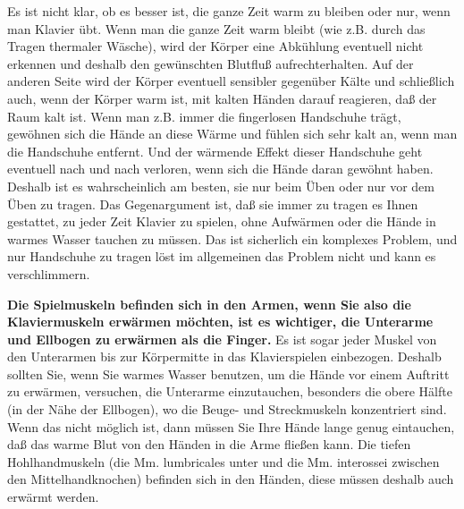 Es ist nicht klar, ob es besser ist, die ganze Zeit warm zu bleiben oder nur, wenn man Klavier übt.
Wenn man die ganze Zeit warm bleibt (wie z.B. durch das Tragen thermaler Wäsche), wird der Körper eine Abkühlung eventuell nicht erkennen und deshalb den gewünschten Blutfluß aufrechterhalten.
Auf der anderen Seite wird der Körper eventuell sensibler gegenüber Kälte und schließlich auch, wenn der Körper warm ist, mit kalten Händen darauf reagieren, daß der Raum kalt ist.
Wenn man z.B. immer die fingerlosen Handschuhe trägt, gewöhnen sich die Hände an diese Wärme und fühlen sich sehr kalt an, wenn man die Handschuhe entfernt.
Und der wärmende Effekt dieser Handschuhe geht eventuell nach und nach verloren, wenn sich die Hände daran gewöhnt haben.
Deshalb ist es wahrscheinlich am besten, sie nur beim Üben oder nur vor dem Üben zu tragen.
Das Gegenargument ist, daß sie immer zu tragen es Ihnen gestattet, zu jeder Zeit Klavier zu spielen, ohne Aufwärmen oder die Hände in warmes Wasser tauchen zu müssen.
Das ist sicherlich ein komplexes Problem, und nur Handschuhe zu tragen löst im allgemeinen das Problem nicht und kann es verschlimmern.

\textbf{Die Spielmuskeln befinden sich in den Armen, wenn Sie also die Klaviermuskeln erwärmen möchten, ist es wichtiger, die Unterarme und Ellbogen zu erwärmen als die Finger.}
Es ist sogar jeder Muskel von den Unterarmen bis zur Körpermitte in das Klavierspielen einbezogen.
Deshalb sollten Sie, wenn Sie warmes Wasser benutzen, um die Hände vor einem Auftritt zu erwärmen, versuchen, die Unterarme einzutauchen, besonders die obere Hälfte (in der Nähe der Ellbogen), wo die Beuge- und Streckmuskeln konzentriert sind.
Wenn das nicht möglich ist, dann müssen Sie Ihre Hände lange genug eintauchen, daß das warme Blut von den Händen in die Arme fließen kann.
Die tiefen Hohlhandmuskeln (die Mm. lumbricales unter und die Mm. interossei zwischen den Mittelhandknochen) befinden sich in den Händen, diese müssen deshalb auch erwärmt werden.

